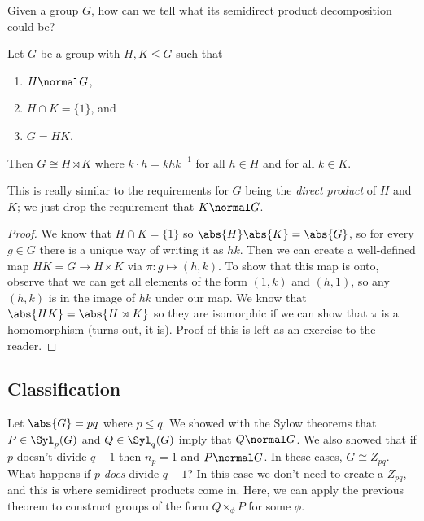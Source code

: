 Given a group $G$, how can we tell what its semidirect product decomposition could be?

\begin{theorem}
Let $G$ be a group with $H,K \leq G$ such that 
\begin{enumerate}
\item $H \normal G$,
\item $H \cap K = \{1\}$, and 
\item $G = HK$.
\end{enumerate}
Then $G \cong H \rtimes K$ where $k \cdot h = khk^{-1}$ for all $h \in H$ and for all $k \in K$.
\end{theorem}

This is really similar to the requirements for $G$ being the \emph{direct product} of $H$ and $K$; we just drop the requirement that $K \normal G$.

\begin{proof}
We know that $H \cap K = \{1\}$ so $\abs{H}\abs{K} = \abs{G}$, so for every $g \in G$ there is a unique way of writing it as $hk$. Then we can create a well-defined map $HK = G \to H \rtimes K$ via $\pi : g \mapsto (h,k)$. To show that this map is onto, observe that we can get all elements of the form $(1,k)$ and $(h,1)$, so any $(h,k)$ is in the image of $hk$ under our map. We know that $\abs{HK} = \abs{H \rtimes K}$ so they are isomorphic if we can show that $\pi$ is a homomorphism (turns out, it is). Proof of this is left as an exercise to the reader.
\end{proof}

\subsection{Classification}

Let $\abs{G} = pq$ where $p \leq q$. We showed with the Sylow theorems that $P \in \Syl_p(G)$ and $Q \in \Syl_q(G)$ imply that $Q \normal G$. We also showed that if $p$ doesn't divide $q - 1$ then $n_p = 1$ and $P \normal G$. In these cases, $G \cong Z_{pq}$. What happens if $p$ \emph{does} divide $q-1$? In this case we don't need to create a $Z_{pq}$, and this is where semidirect products come in. Here, we can apply the previous theorem to construct groups of the form $Q \rtimes_\phi P$ for some $\phi$.

